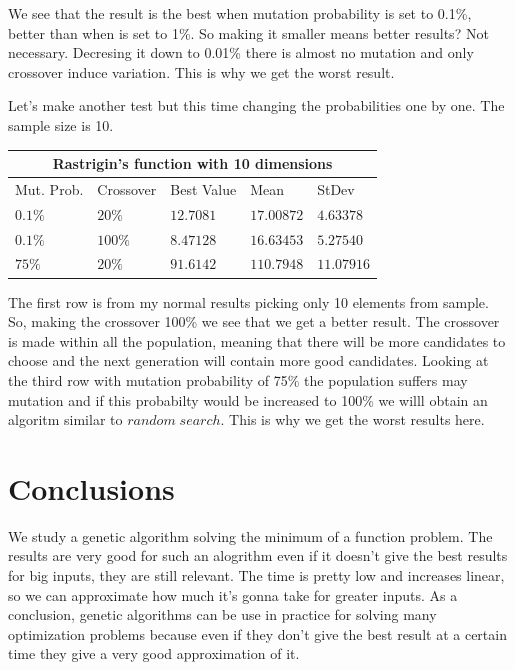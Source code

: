 \documentclass[12pt,leqno]{article}
\begin{document}
  We see that the result is the best when mutation probability is set to 0.1\%, better than when is set to 1\%. So making it smaller means better results?
  Not necessary. Decresing it down to 0.01\% there is almost no mutation and only crossover induce variation. This is why we get the worst result.


  Let's make another test but this time changing the probabilities one by one. The sample size is 10.
\begin{center}
  \begin{tabular}{|p{2.3cm}||p{3cm}|p{2cm}|p{2cm}|p{2cm}|} 
    \hline
    \multicolumn{5}{|c|}{Rastrigin's function with 10 dimensions} \\
    \hline
    Mut. Prob.  & Crossover & Best Value & Mean & StDev \\ 
    \hline\hline
    $ 0.1\%  $ & $ 20\% $ & $ 12.7081 $ & $ 17.00872 $ & $ 4.63378 $ \\ 
    \hline
    $ 0.1\%  $ & $ 100\% $  & $ 8.47128 $ & $ 16.63453 $ & $ 5.27540 $ \\ 
    \hline
    $ 75\%   $ & $ 20\% $ & $ 91.6142 $ & $ 110.7948 $ & $ 11.07916 $ \\ 
    \hline
 \end{tabular}
\end{center}

  The first row is from my normal results picking only 10 elements from sample. So, making the crossover 100\% we see that we get a better result. The crossover is made within all the population, meaning that there will be more candidates to choose and the next generation will contain more good candidates.
  Looking at the third row with mutation probability of 75\% the population suffers may mutation and if this probabilty would be increased to 100\% we willl obtain an algoritm similar to $ random \; search $. This is why we get the worst results here.


\section{Conclusions}
  We study a genetic algorithm solving the minimum of a function problem. The results are very good for such an alogrithm even if it doesn't give the best results for big inputs, they are still relevant.
  The time is pretty low and increases linear, so we can approximate how much it's gonna take for greater inputs. As a conclusion, genetic algorithms can be use in practice for solving many optimization problems because even if they don't give the best result at a certain time
  they give a very good approximation of it. 
\end{document}

